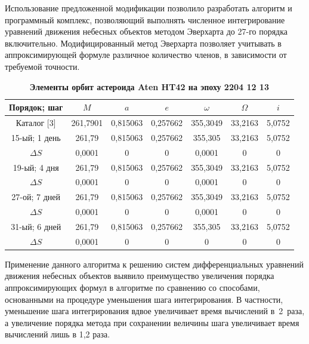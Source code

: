 Использование предложенной модификации позволило разработать алгоритм и программный комплекс, позволяющий выполнять численное интегрирование уравнений движения небесных объектов методом  Эверхарта до 27-го порядка включительно. Модифицированный метод  Эверхарта позволяет учитывать в аппроксимирующей формуле различное количество членов, в зависимости от требуемой точности.



\begin{table}[b!]

\vspace{-6mm}
\small \centering
\caption{\bf Элементы орбит астероида Aten\; HT42 на эпоху 2204 12 13}\vspace{-3mm}
\begin{tabular}{c|c|c|c|c|c|c}
\hline 	
\footnotesize
Порядок; шаг&	\footnotesize $M$	&	\footnotesize $a$	&	\footnotesize $e$	&	\footnotesize $\omega$	&	\footnotesize $\Omega$	&	\footnotesize $i$	\\
\hline
\rule{0mm}{12pt}%
Каталог	[3]&	261,7901	&	0,815063	&	0,257662	&	355,3049	&	33,2163	&	5,0752	\\ \hline
15-ый; 1 день	&	261,79	&	0,815063	&	0,257662	&	355,305	&	33,2163	&	5,0752	\\
$\Delta S$	&	0,0001	&	0	&	0	&	0,0001	&	0	&	0	\\\hline
19-ый; 4 дня	&	261,79	&	0,815063	&	0,257662	&	355,3049	&	33,2163	&	5,0752	\\
$\Delta S$	&	0,0001	&	0	&	0	&	0,0001	&	0	&	0	\\\hline
27-ой; 7 дней 	&	261,79	&	0,815063	&	0,257662	&	355,3049	&	33,2163	&	5,0752	\\
$\Delta S$	&	0,0001	&	0	&	0	&	0,0001	&	0	&	0	\\\hline
31-ый; 6 дней	&	261,79	&	0,815063	&	0,257662	&	355,305	&	33,2163	&	5,0752	\\
$\Delta S$	&	0,0001	&	0	&	0	&	0	&	0	&	0	\\
\hline
\end{tabular}
\vspace{-4mm}
\end{table}


Применение данного алгоритма к решению систем дифференциальных уравнений движения небесных объектов выявило преимущество увеличения порядка аппроксимирующих формул в алгоритме по сравнению со способами, основанными на процедуре уменьшения шага интегрирования. В частности, уменьшение шага интегрирования вдвое увеличивает время вычислений в~2~раза, а увеличение порядка метода при сохранении величины шага увеличивает время вычислений лишь в 1,2 раза.

